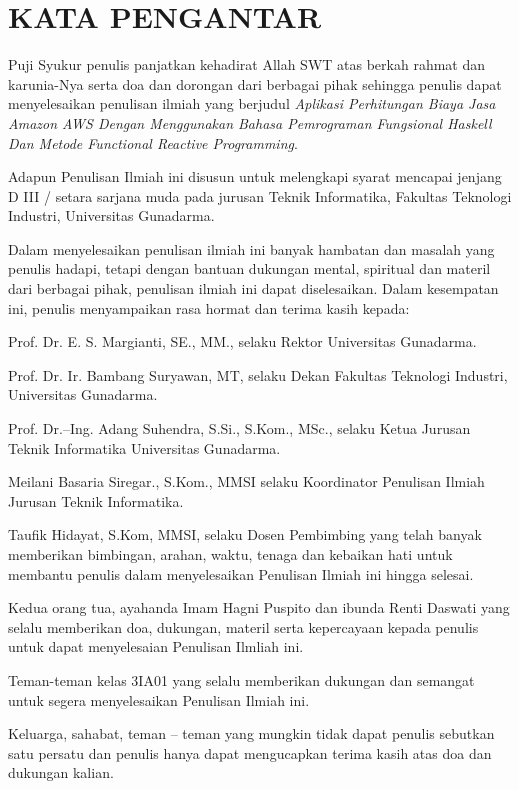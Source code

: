 \documentclass[pi.tex]{subfile}
\begin{document}
\chapter*{KATA PENGANTAR}

Puji Syukur penulis panjatkan kehadirat Allah SWT atas berkah rahmat dan karunia-Nya serta doa dan dorongan dari berbagai pihak sehingga penulis dapat menyelesaikan penulisan ilmiah yang berjudul \emph{Aplikasi Perhitungan Biaya Jasa Amazon AWS Dengan Menggunakan Bahasa Pemrograman Fungsional Haskell Dan Metode Functional Reactive Programming}.

Adapun Penulisan Ilmiah ini disusun untuk melengkapi syarat mencapai jenjang D III / setara sarjana muda pada jurusan Teknik Informatika, Fakultas Teknologi Industri, Universitas Gunadarma.

Dalam menyelesaikan penulisan ilmiah ini banyak hambatan dan masalah yang penulis hadapi, tetapi dengan bantuan dukungan mental, spiritual dan materil dari berbagai pihak, penulisan ilmiah ini dapat diselesaikan. Dalam kesempatan ini, penulis menyampaikan rasa hormat dan terima kasih kepada:

Prof. Dr. E. S. Margianti, SE., MM., selaku Rektor Universitas Gunadarma.

Prof. Dr. Ir. Bambang Suryawan, MT, selaku Dekan Fakultas Teknologi Industri, Universitas Gunadarma.

Prof. Dr.–Ing. Adang Suhendra, S.Si., S.Kom., MSc.,  selaku Ketua Jurusan Teknik Informatika Universitas Gunadarma.

Meilani Basaria Siregar., S.Kom., MMSI selaku Koordinator Penulisan Ilmiah Jurusan Teknik Informatika.

Taufik Hidayat, S.Kom, MMSI, selaku Dosen Pembimbing yang telah banyak memberikan bimbingan, arahan, waktu, tenaga dan kebaikan hati untuk membantu penulis dalam menyelesaikan Penulisan Ilmiah ini hingga selesai.

Kedua orang tua, ayahanda Imam Hagni Puspito dan ibunda Renti Daswati  yang selalu memberikan doa, dukungan, materil serta kepercayaan kepada penulis untuk dapat menyelesaian Penulisan Ilmliah ini.

Teman-teman kelas 3IA01 yang selalu memberikan dukungan dan semangat untuk segera menyelesaikan Penulisan Ilmiah ini.

Keluarga, sahabat, teman – teman yang mungkin tidak dapat penulis sebutkan satu persatu dan penulis hanya dapat mengucapkan terima kasih atas doa dan dukungan kalian.
\end{document}
